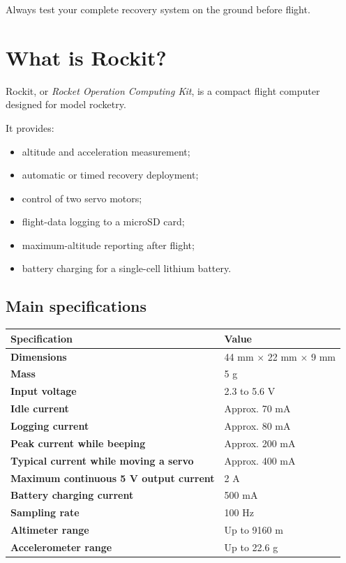 \documentclass[11pt,a4paper]{article}
\begin{document}
Always test your complete recovery system on the ground before flight.

\section{What is Rockit?}

Rockit, or \textit{Rocket Operation Computing Kit}, is a compact flight computer designed for model rocketry.

It provides:

\begin{itemize}
    \item altitude and acceleration measurement;
    \item automatic or timed recovery deployment;
    \item control of two servo motors;
    \item flight-data logging to a microSD card;
    \item maximum-altitude reporting after flight;
    \item battery charging for a single-cell lithium battery.
\end{itemize}

\subsection{Main specifications}

\begin{table}[H]
\centering
\begin{tabularx}{\textwidth}{>{\bfseries}l X}
\toprule
Specification & Value \\
\midrule
Dimensions & 44 mm $\times$ 22 mm $\times$ 9 mm \\
Mass & 5 g \\
Input voltage & 2.3 to 5.6 V \\
Idle current & Approx. 70 mA \\
Logging current & Approx. 80 mA \\
Peak current while beeping & Approx. 200 mA \\
Typical current while moving a servo & Approx. 400 mA \\
Maximum continuous 5 V output current & 2 A \\
Battery charging current & 500 mA \\
Sampling rate & 100 Hz \\
Altimeter range & Up to 9160 m \\
Accelerometer range & Up to 22.6 g \\
\bottomrule
\end{tabularx}
\end{table}
\end{document}
